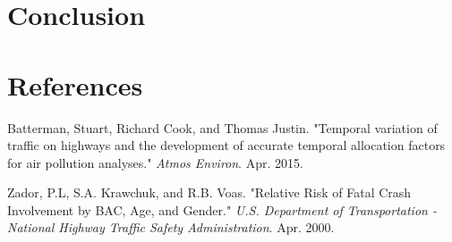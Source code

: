 \documentclass[11pt, oneside]{article}   	%
\begin{document}
\section*{Conclusion}

\section*{References}
\begin{hangparas}{1.27cm}{1}
Batterman, Stuart, Richard Cook, and Thomas Justin. "Temporal variation of traffic on highways and the development of accurate temporal allocation factors for air pollution analyses." \textit{Atmos Environ}. Apr. 2015.

Zador, P.L, S.A. Krawchuk, and R.B. Voas. "Relative Risk of Fatal Crash Involvement by BAC, Age, and Gender." \textit{U.S. Department of Transportation - National Highway Traffic Safety Administration}. Apr. 2000.




\end{hangparas}
\end{document}
